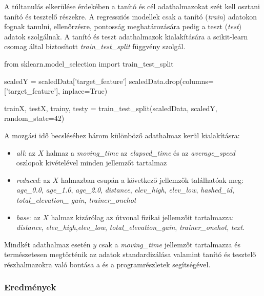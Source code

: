 \begin{programreszlet} A túltanulás elkerülése érdekében a tanító és cél adathalmazokat szét kell osztani tanító és tesztelő részekre. A regressziós modellek csak a tanító (\textit{train}) adatokon fognak tanulni, ellenőrzésre, pontosság meghatározására pedig a teszt (\textit{test}) adatok szolgálnak. A tanító és teszt adathalmazok kialakítására a scikit-learn csomag által biztosított \textit{train\_test\_split} függvény szolgál.
\begin{python}
from sklearn.model_selection import train_test_split
		
scaledY = scaledData['{target_feature}']
scaledData.drop(columns=['{target_feature}'], inplace=True)
		
trainX, testX, trainy, testy = train_test_split(scaledData, scaledY, 
						random_state=42)
\end{python}
\label{prog:movingTrainTestSplit}
\end{programreszlet}


A mozgási idő becsléséhez három különböző adathalmaz kerül kialakításra:
\begin{itemize}
	\item \textit{all}: az $X$ halmaz a \textit{moving\_time} az \textit{elapsed\_time} és az \textit{average\_speed} oszlopok kivételével minden jellemzőt tartalmaz
	\item \textit{reduced}:  az $X$ halmazban csupán a következő jellemzők találhatóak meg:  \textit{age\_0.0}, \textit{age\_1.0}, \textit{age\_2.0}, \textit{distance}, \textit{elev\_high}, \textit{elev\_low}, \textit{hashed\_id}, \textit{total\_elevation\_ gain}, \textit{trainer\_onehot}
	\item \textit{base}: az $X$ halmaz kizárólag az útvonal fizikai jellemzőit tartalmazza: \textit{distance}, \textit{elev\_high},\textit{elev\_low}, \textit{total\_elevation\_gain}, \textit{trainer\_onehot}, \textit{text}.
\end{itemize}
Mindkét adathalmaz esetén $y$ csak a \textit{moving\_time} jellemzőt tartalmazza és természetesen megtörténik az adatok standardizálása valamint tanító és tesztelő részhalmazokra való bontása a  és a  programrészletek segítségével.


\subsubsection{Eredmények}

